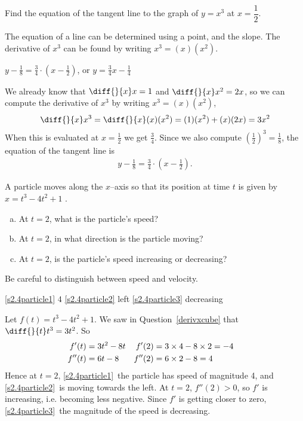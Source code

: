 \begin{Mquestion}[2015Q]\label{derivxcube}
Find the equation of the tangent line to the graph of $y=x^3$ at
$x=\dfrac{1}{2}$.
\end{Mquestion}
\begin{hint} The equation of a line can be determined using a point, and the slope. The derivative of $x^3$ can be found by writing $x^3=(x)(x^2)$.
\end{hint}
\begin{answer} $y -  \frac{1}{8} = \frac{3}{4}\cdot \left(x-\frac{1}{2}\right)$, or $y= \tfrac{3}{4} x - \tfrac{1}{4}$
\end{answer}
\begin{solution} 
We already know that $\diff{}{x}x=1$ and $\diff{}{x}x^2=2x$, so we can
compute the derivative of $x^3$ by writing $x^3=(x)(x^2)$,
\begin{equation*}
\diff{}{x} x^3 =\diff{}{x} (x)(x^2) = (1)(x^2)+(x)(2x)=3x^2
\end{equation*}
When this is evaluated at $x=\frac{1}{2}$ we get $\frac{3}{4}$. Since we 
also compute $\left( \frac{1}{2}\right)^3=\frac{1}{8}$, the equation of the tangent line is
\begin{align*}
y -  \frac{1}{8} = \frac{3}{4}\cdot \left(x-\frac{1}{2}\right).
\end{align*}
\end{solution}


\begin{Mquestion}[1999H]
A particle moves along the $x$--axis so that its position
 at time $t$ is given by $x=t^3-4t^2+1$ .
\begin{enumerate}[(a)]
\item\label{s2.4particle1}At $t=2$, what is the particle's speed?
\item\label{s2.4particle2}At $t=2$, in what direction is the particle moving?
\item\label{s2.4particle3}At $t=2$, is the particle's speed increasing or decreasing?
\end{enumerate}
\end{Mquestion}
\begin{hint} Be careful to distinguish between speed and velocity.
\end{hint}
\begin{answer}
\eqref{s2.4particle1} $4$\qquad
\eqref{s2.4particle2} left \qquad
\eqref{s2.4particle3} decreasing
\end{answer}
\begin{solution}
Let $f(t)=t^3-4t^2+1$. We saw in Question~\ref{derivxcube} that 
$\diff{}{t}t^3=3t^2$. So
\begin{align*}
f'(t)&=3t^2-8t & f'(2)&=3\times 4-8\times 2=-4\cr
f''(t)&=6t-8 & f''(2)&=6\times 2-8=4\cr
\end{align*}
Hence at $t=2$, \eqref{s2.4particle1}~the particle has speed of magnitude {4}, and \eqref{s2.4particle2}~is
moving {towards the left}.
At $t=2$, $f''(2)>0$, so $f'$ is increasing, i.e.
becoming less negative. Since $f'$ is getting closer to zero, \eqref{s2.4particle3}~the magnitude of the speed is
{decreasing}.
\end{solution}


